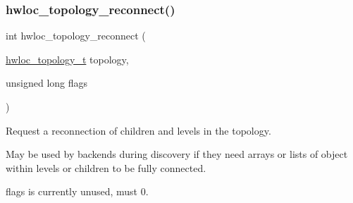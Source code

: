 \subsubsection{\texorpdfstring{hwloc\+\_\+topology\+\_\+reconnect()}{hwloc\_topology\_reconnect()}}
{\footnotesize\ttfamily int hwloc\+\_\+topology\+\_\+reconnect (\begin{DoxyParamCaption}\item[{\hyperlink{a00186_ga9d1e76ee15a7dee158b786c30b6a6e38}{hwloc\+\_\+topology\+\_\+t}}]{topology,  }\item[{unsigned long}]{flags }\end{DoxyParamCaption})}



Request a reconnection of children and levels in the topology. 

May be used by backends during discovery if they need arrays or lists of object within levels or children to be fully connected.

{\ttfamily flags} is currently unused, must 0. 